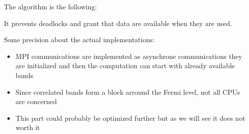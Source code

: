 
\begin{frame}[fragile]
  The algorithm is the following:
  \begin{algorithm}[H]
  \end{algorithm}
  It prevents deadlocks and grant that data are available when they are used.
\end{frame}

\begin{frame}
  Some precision about the actual implementations:
  \begin{itemize}
    \item MPI communications are implemented as asynchrone communications they are
      initialized and then the computation can start with already available bands
    \item Since correlated bands form a block arround the Fermi level, not all CPUs
      are concerned
    \item This part could probably be optimized further but as we will see it does not worth it

  \end{itemize}
\end{frame}
